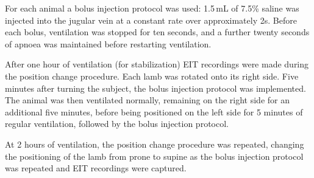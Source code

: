 For each animal a bolus injection protocol was used: 
1.5\,mL of 7.5\% saline was injected into the jugular vein
at a constant rate over approximately 2s.
Before each bolus, ventilation was stopped for ten seconds,
and a further twenty seconds of apnoea was maintained before
restarting ventilation.

After one hour of ventilation (for stabilization) EIT recordings were made 
during the position change procedure. Each lamb was rotated
onto its right side. Five minutes after turning
the subject, the bolus injection protocol was implemented.
The animal was then ventilated normally, remaining on the right side for 
an additional five minutes, before being positioned on the left side 
for 5 minutes of regular ventilation, followed by the bolus
injection protocol.

At 2 hours of ventilation, the position change procedure was repeated,
changing the positioning of the lamb from prone to supine as the bolus 
injection protocol was repeated and EIT recordings were captured.

